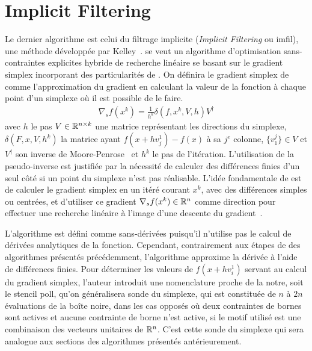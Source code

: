 \section{Implicit Filtering}
Le dernier algorithme est celui du filtrage implicite (\textit{Implicit Filtering} ou \textsf{imfil}), une méthode développée par Kelley~\cite{Kell99b,Kelley2011}. \imfil se veut un algorithme d'optimisation sans-contraintes explicites hybride de recherche linéaire se basant sur le gradient simplex incorporant des particularités de \CS. On définira le gradient simplex de \imfil comme l'approximation du gradient en calculant la valeur de la fonction à chaque point d'un simplexe où il est possible de le faire.
\begin{gather*}
\nabla_{s}f(x^k) = \frac{1}{h^k}\delta(f,x^k,V,h)V^{\dagger}
\end{gather*}
avec $h$ le pas $V\in\mathbb{R}^{n \times k}$ une matrice représentant les directions du simplexe, $\delta(F,x,V,h^k)$ la matrice ayant $f(x+hv_j^1) - f(x)$ à sa $j^e$ colonne, $\{v_1^j\} \in V$ et $V^{\dagger}$ son inverse de Moore-Penrose~\cite{GoVL1996} et $h^k$ le pas de l'itération. L'utilisation de la pseudo-inverse est justifiée par la nécessité de calculer des différences finies d'un seul côté si un point du simplexe n'est pas réalisable. L'idée fondamentale de \imfil est de calculer le gradient simplex en un itéré courant $x^k$, avec des différences simples ou centrées, et d'utiliser ce gradient $\nabla_{s}f(x^k) \in \mathbb{R}^n$ comme direction pour effectuer une recherche linéaire à l'image d'une descente du gradient~\cite{NoWr2006}.  
  
L'algorithme est défini comme sans-dérivées puisqu'il n'utilise pas le calcul de dérivées analytiques de la fonction. Cependant, contrairement aux étapes de \POLL des algorithmes présentés précédemment, l'algorithme approxime la dérivée à l'aide de différences finies. Pour déterminer les valeurs de $f(x+hv_i^1)$ servant au calcul du gradient simplex, l'auteur introduit une nomenclature proche de la notre, soit le \textsf{stencil poll}, qu'on généralisera sonde du simplexe, qui est constituée de $n$ à $2n$ évaluations de la boîte noire, dans les cas opposés où deux contraintes de bornes sont actives et aucune contrainte de borne n'est active, si le motif utilisé est une combinaison des vecteurs unitaires de $\mathbb{R}^n$. C'est cette sonde du simplexe qui sera analogue aux sections \POLL des algorithmes présentés antérieurement.

